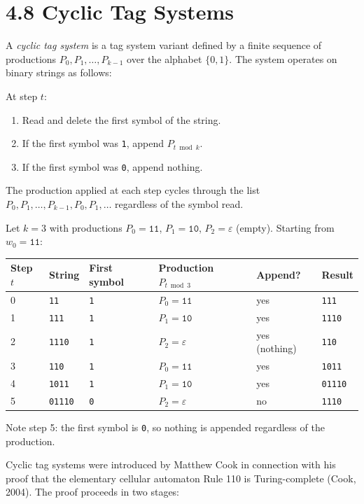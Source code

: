 \section{4.8 Cyclic Tag Systems}

\begin{definition}
A \textit{cyclic tag system} is a tag system variant defined by a finite sequence of productions $P_0, P_1, \ldots, P_{k-1}$ over the alphabet $\{ 0, 1\} $. The system operates on binary strings as follows:

At step $t$:
\end{definition}
\begin{enumerate}
  \item Read and delete the first symbol of the string.
  \item If the first symbol was \texttt{1}, append $P_{t \bmod k}$.
  \item If the first symbol was \texttt{0}, append nothing.
\end{enumerate}

The production applied at each step cycles through the list $P_0, P_1, \ldots, P_{k-1}, P_0, P_1, \ldots$ regardless of the symbol read.

\begin{example}
Let $k = 3$ with productions $P_0 = \texttt{11}$, $P_1 = \texttt{10}$, $P_2 = \varepsilon$ (empty). Starting from $w_0 = \texttt{11}$:

\begin{tabular}{|l|l|l|l|l|l|}
\hline
Step $t$ & String & First symbol & Production $P_{t \bmod 3}$ & Append? & Result \\
\hline
0 & \texttt{11} & \texttt{1} & $P_0 = \texttt{11}$ & yes & \texttt{111} \\
1 & \texttt{111} & \texttt{1} & $P_1 = \texttt{10}$ & yes & \texttt{1110} \\
2 & \texttt{1110} & \texttt{1} & $P_2 = \varepsilon$ & yes (nothing) & \texttt{110} \\
3 & \texttt{110} & \texttt{1} & $P_0 = \texttt{11}$ & yes & \texttt{1011} \\
4 & \texttt{1011} & \texttt{1} & $P_1 = \texttt{10}$ & yes & \texttt{01110} \\
5 & \texttt{01110} & \texttt{0} & $P_2 = \varepsilon$ & no & \texttt{1110} \\
\hline
\end{tabular}


Note step 5: the first symbol is \texttt{0}, so nothing is appended regardless of the production.

Cyclic tag systems were introduced by Matthew Cook in connection with his proof that the elementary cellular automaton Rule 110 is Turing-complete (Cook, 2004). The proof proceeds in two stages:
\end{example}

